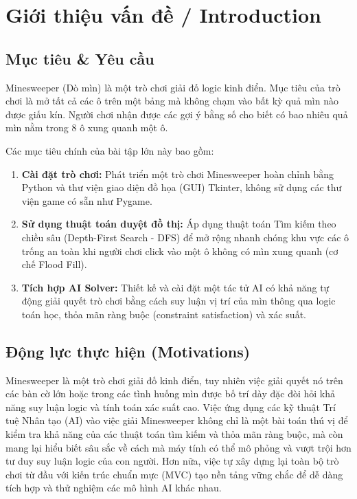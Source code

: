 \section{Giới thiệu vấn đề / Introduction}

\subsection{Mục tiêu \& Yêu cầu}
Minesweeper (Dò mìn) là một trò chơi giải đố logic kinh điển. Mục tiêu của trò chơi là mở tất cả các ô trên một bảng mà không chạm vào bất kỳ quả mìn nào được giấu kín. Người chơi nhận được các gợi ý bằng số cho biết có bao nhiêu quả mìn nằm trong 8 ô xung quanh một ô.

Các mục tiêu chính của bài tập lớn này bao gồm:
\begin{enumerate}
    \item \textbf{Cài đặt trò chơi:} Phát triển một trò chơi Minesweeper hoàn chỉnh bằng Python và thư viện giao diện đồ họa (GUI) Tkinter, không sử dụng các thư viện game có sẵn như Pygame.
    \item \textbf{Sử dụng thuật toán duyệt đồ thị:} Áp dụng thuật toán Tìm kiếm theo chiều sâu (Depth-First Search - DFS) để mở rộng nhanh chóng khu vực các ô trống an toàn khi người chơi click vào một ô không có mìn xung quanh (cơ chế Flood Fill).
    \item \textbf{Tích hợp AI Solver:} Thiết kế và cài đặt một tác tử AI có khả năng tự động giải quyết trò chơi bằng cách suy luận vị trí của mìn thông qua logic toán học, thỏa mãn ràng buộc (constraint satisfaction) và xác suất.
\end{enumerate}

\subsection{Động lực thực hiện (Motivations)}
Minesweeper là một trò chơi giải đố kinh điển, tuy nhiên việc giải quyết nó trên các bàn cờ lớn hoặc trong các tình huống mìn được bố trí dày đặc đòi hỏi khả năng suy luận logic và tính toán xác suất cao. Việc ứng dụng các kỹ thuật Trí tuệ Nhân tạo (AI) vào việc giải Minesweeper không chỉ là một bài toán thú vị để kiểm tra khả năng của các thuật toán tìm kiếm và thỏa mãn ràng buộc, mà còn mang lại hiểu biết sâu sắc về cách mà máy tính có thể mô phỏng và vượt trội hơn tư duy suy luận logic của con người. Hơn nữa, việc tự xây dựng lại toàn bộ trò chơi từ đầu với kiến trúc chuẩn mực (MVC) tạo nền tảng vững chắc để dễ dàng tích hợp và thử nghiệm các mô hình AI khác nhau.

